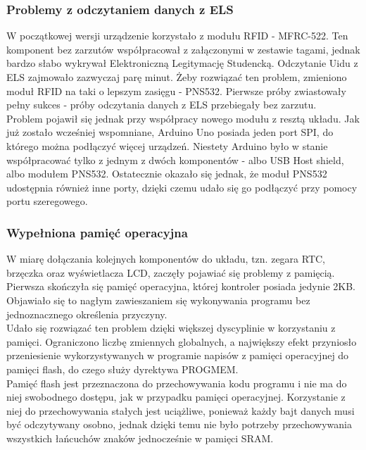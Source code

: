 \documentclass[declaration,shortabstract, mgr]{iithesis}
\begin{document}
\subsubsection{Problemy z odczytaniem danych z ELS}
\indent W początkowej wersji urządzenie korzystało z modułu RFID - MFRC-522. Ten komponent bez zarzutów współpracował z załączonymi w zestawie tagami, jednak bardzo słabo wykrywał Elektroniczną Legitymację Studencką. Odczytanie Uidu z ELS zajmowało zazwyczaj parę minut. Żeby rozwiązać ten problem, zmieniono moduł RFID na taki o lepszym zasięgu - PNS532. Pierwsze próby zwiastowały pełny sukces - próby odczytania danych z ELS przebiegały bez zarzutu. \\
\indent Problem pojawił się jednak przy współpracy nowego modułu z resztą układu. Jak już zostało wcześniej wspomniane, Arduino Uno posiada jeden port SPI, do którego można podłączyć więcej urządzeń. Niestety Arduino było w stanie współpracować tylko z jednym z dwóch komponentów - albo USB Host shield, albo modułem PNS532. Ostatecznie okazało się jednak, że moduł PNS532 udostępnia również inne porty, dzięki czemu udało się go podłączyć przy pomocy portu szeregowego.
\subsubsection{Wypełniona pamięć operacyjna}
\indent W miarę dołączania kolejnych komponentów do układu, tzn. zegara RTC, brzęczka oraz wyświetlacza LCD, zaczęły pojawiać się problemy z pamięcią. \\
\indent Pierwsza skończyła się pamięć operacyjna, której kontroler posiada jedynie 2KB. Objawiało się to nagłym zawieszaniem się wykonywania programu bez jednoznacznego określenia przyczyny.\\
\indent Udało się rozwiązać ten problem dzięki większej dyscyplinie w korzystaniu z pamięci. Ograniczono liczbę zmiennych globalnych, a największy efekt przyniosło przeniesienie wykorzystywanych w programie napisów z pamięci operacyjnej do pamięci flash, do czego służy dyrektywa PROGMEM.\\
\indent Pamięć flash jest przeznaczona do przechowywania kodu programu i nie ma do niej swobodnego dostępu, jak w przypadku pamięci operacyjnej. Korzystanie z niej do przechowywania stałych jest uciążliwe, ponieważ każdy bajt danych musi być odczytywany osobno, jednak dzięki temu nie było potrzeby przechowywania wszystkich łańcuchów znaków jednocześnie w pamięci SRAM.
\end{document}
